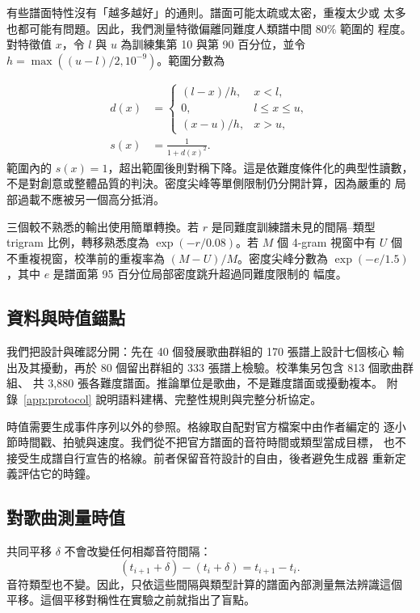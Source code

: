 \documentclass[10pt,twocolumn]{article}
\begin{document}
有些譜面特性沒有「越多越好」的通則。譜面可能太疏或太密，重複太少或
太多也都可能有問題。因此，我們測量特徵偏離同難度人類譜中間 80\% 範圍的
程度。對特徵值 $x$，令 $l$ 與 $u$ 為訓練集第 10 與第 90 百分位，並令
$h=\max((u-l)/2,10^{-9})$。範圍分數為

\begin{equation}
\begin{aligned}
d(x)&=
\begin{cases}
(l-x)/h, & x<l,\\
0,       & l\leq x\leq u,\\
(x-u)/h, & x>u,
\end{cases}\\
s(x)&=\frac{1}{1+d(x)^2}.
\end{aligned}
\label{eq:band}
\end{equation}
範圍內的 $s(x)=1$，超出範圍後則對稱下降。這是依難度條件化的典型性讀數，
不是對創意或整體品質的判決。密度尖峰等單側限制仍分開計算，因為嚴重的
局部過載不應被另一個高分抵消。

三個較不熟悉的輸出使用簡單轉換。若 $r$ 是同難度訓練譜未見的間隔--類型
trigram 比例，轉移熟悉度為 $\exp(-r/0.08)$。若 $M$ 個 4-gram 視窗中有
$U$ 個不重複視窗，校準前的重複率為 $(M-U)/M$。密度尖峰分數為
$\exp(-e/1.5)$，其中 $e$ 是譜面第 95 百分位局部密度跳升超過同難度限制的
幅度。

\subsection{資料與時值錨點}\label{sec:data}

我們把設計與確認分開：先在 40 個發展歌曲群組的 170 張譜上設計七個核心
輸出及其擾動，再於 80 個留出群組的 333 張譜上檢驗。校準集另包含 813 個歌曲群組、
共 3{,}880 張各難度譜面。推論單位是歌曲，不是難度譜面或擾動複本。
附錄~\ref{app:protocol} 說明語料建構、完整性規則與完整分析協定。

時值需要生成事件序列以外的參照。格線取自配對官方檔案中由作者編定的
逐小節時間戳、拍號與速度。我們從不把官方譜面的音符時間或類型當成目標，
也不接受生成譜自行宣告的格線。前者保留音符設計的自由，後者避免生成器
重新定義評估它的時鐘。

\subsection{對歌曲測量時值}\label{sec:timingmethod}

共同平移 $\delta$ 不會改變任何相鄰音符間隔：
\begin{equation}
(t_{i+1}+\delta)-(t_i+\delta)=t_{i+1}-t_i.
\label{eq:shift-invariance}
\end{equation}
音符類型也不變。因此，只依這些間隔與類型計算的譜面內部測量無法辨識這個
平移。這個平移對稱性在實驗之前就指出了盲點。
\end{document}
